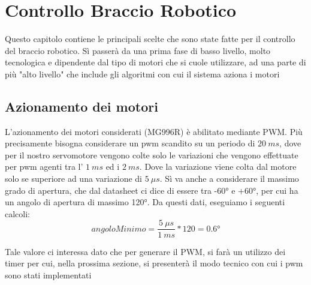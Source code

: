 \chapter{Controllo Braccio Robotico}
Questo capitolo contiene le principali scelte che sono state fatte per il controllo del braccio robotico. Sì passerà da una prima fase di basso livello, molto tecnologica e dipendente dal tipo di motori che si cuole utilizzare, ad una parte di più "alto livello" che include gli algoritmi con cui il sistema aziona i motori

\section{Azionamento dei motori}
L'azionamento dei motori considerati (MG996R) è abilitato mediante PWM. Più precisamente bisogna considerare un pwm scandito su un periodo di \(20\ ms\), dove per il nostro servomotore vengono colte solo le variazioni che vengono effettuate per pwm agenti tra l' \(1\ ms \) ed i \(2\ ms\).
Dove la variazione viene colta dal motore solo se superiore ad una variazione di \(5\ \mu s\). Sì va anche a considerare il massimo grado di apertura, che dal datasheet ci dice di essere tra -60° e +60°, per cui ha un angolo di apertura di massimo 120°.
Da questi dati, eseguiamo i seguenti calcoli:
\[
angoloMinimo = \frac{5\ \mu s}{1\ ms} * 120 = 0.6°
\]

Tale valore ci interessa dato che per generare il PWM, si farà un utilizzo dei timer per cui, nella prossima sezione, si presenterà il modo tecnico con cui i pwm sono stati implementati


